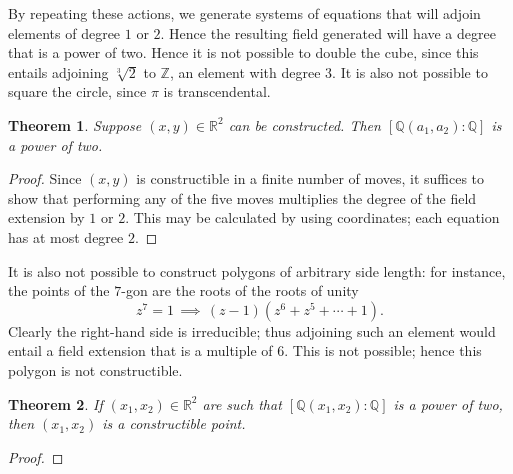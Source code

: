 \documentclass[11pt]{article}
\newtheorem{theorem}{Theorem}
\begin{document}
By repeating these actions, we generate systems of equations that will adjoin elements of degree $1$ or $2$. Hence the resulting field generated will have a degree that is a power of two. Hence it is not possible to double the cube, since this entails adjoining $\sqrt[3]{2}$ to $\mathbb{Z}$, an element with degree $3$. It is also not possible to square the circle, since $\pi$ is transcendental.

\begin{adjustwidth}{0.5cm}{}
  \begin{theorem}
    Suppose $(x, y) \in \mathbb{R}^{2}$ can be constructed. Then $[\mathbb{Q} (a_{1}, a_{2}) : \mathbb{Q}]$ is a power of two.
  \end{theorem}
  \begin{proof}
    Since $(x, y)$ is constructible in a finite number of moves, it suffices to show that performing any of the five moves multiplies the degree of the field extension by $1$ or $2$. This may be calculated by using coordinates; each equation has at most degree $2$.
  \end{proof}
\end{adjustwidth}

It is also not possible to construct polygons of arbitrary side length: for instance, the points of the $7$-gon are the roots of the roots of unity
\[
  z^{7} = 1 \, \implies \, (z - 1)(z^{6} + z^{5} + \cdots + 1).
\]
Clearly the right-hand side is irreducible; thus adjoining such an element would entail a field extension that is a multiple of $6$. This is not possible; hence this polygon is not constructible.

\begin{adjustwidth}{0.5cm}{}
  \begin{theorem}
    If $(x_{1}, x_{2}) \in \mathbb{R}^{2}$ are such that $[\mathbb{Q}(x_{1}, x_{2}) : \mathbb{Q}]$ is a power of two, then $(x_{1}, x_{2})$ is a constructible point.
  \end{theorem}
  \begin{proof}
    
  \end{proof}
\end{adjustwidth}

\end{document}
